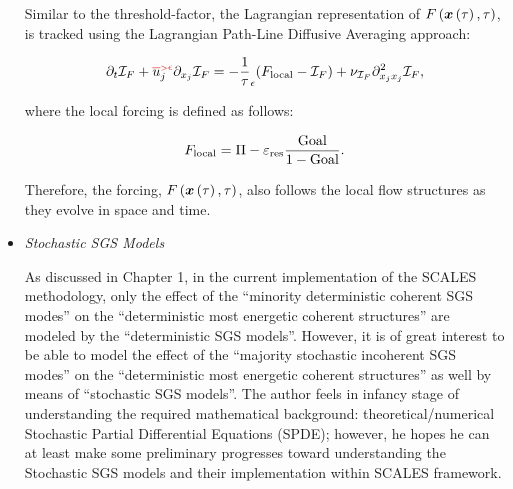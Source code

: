 \begin{itemize}
{Similar to the threshold-factor, the Lagrangian representation of  $F \left(\mbox{\boldmath $x$}\left(\tau\right),\tau\right)$, is tracked using the  Lagrangian Path-Line Diffusive Averaging approach:

\begin{equation}
        \label{eq:LagPathLineDiffAvg} \vspace*{3pt}
        \partial_{t}{\mathcal I}_{F}
        + \bareps[u]_j \partial_{x_j}{\mathcal I}_{F}
        = - \frac 1 \tau_{\epsilon} ( F_{\rm local} - {\mathcal I}_{F} )
        + \nu_{{\mathcal I}_{F}} \partial_{x_jx_j}^2{\mathcal I}_{F},
\end{equation}

where the local forcing is defined as follows:

\begin{equation}
       F_{\rm local} =  \Pi - \varepsilon_{\rm res}  \frac {\rm Goal}{1-{\rm Goal}}.
\end{equation}

Therefore, the forcing, $F \left(\mbox{\boldmath $x$}\left(\tau\right),\tau\right)$, also follows the local flow structures as they evolve in space and time.

%
%





  }
  \item \emph{Stochastic SGS Models} {
  
  As discussed in Chapter 1, in the current implementation of the SCALES methodology, 
  only the effect of the ``minority deterministic coherent SGS modes''  on the ``deterministic most energetic coherent structures'' are modeled by the ``deterministic SGS models''. However, it is of great interest to be able to model 
  the effect of the ``majority stochastic incoherent SGS modes'' on the ``deterministic most energetic coherent structures'' as well by means of 
  ``stochastic SGS models''. The author feels in infancy stage of understanding the required mathematical background: theoretical/numerical Stochastic Partial Differential Equations (SPDE); however, he hopes he can at least make some preliminary progresses toward understanding the Stochastic SGS models and their implementation within SCALES framework.




}
\end{itemize}
